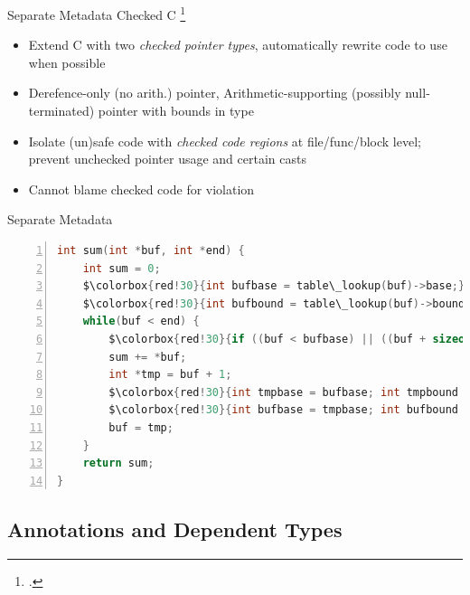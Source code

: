 \documentclass[aspectratio=169]{beamer}
\begin{document}
\begin{frame}{Separate Metadata}
Checked C \footcite{ruef_checked_2017}
    \begin{itemize}
        \item Extend C with two \emph{checked pointer types}, automatically rewrite code to use when possible
        \item Derefence-only (no arith.) pointer, Arithmetic-supporting (possibly null-terminated) pointer with bounds in type
        \item Isolate (un)safe code with \emph{checked code regions} at file/func/block level; prevent unchecked pointer usage and certain casts
        \item Cannot blame checked code for violation
    \end{itemize}
\end{frame}


\begin{frame}[fragile]{Separate Metadata}
  \footnotesize
  \begin{lstlisting}[language=C,numbers=left,mathescape,basicstyle={\footnotesize\ttfamily}]
int sum(int *buf, int *end) {
    int sum = 0;
    $\colorbox{red!30}{int bufbase = table\_lookup(buf)->base;}$
    $\colorbox{red!30}{int bufbound = table\_lookup(buf)->bound;}$
    while(buf < end) {
        $\colorbox{red!30}{if ((buf < bufbase) || ((buf + sizeof(buf)) > bufbound)) abort;}$
        sum += *buf;
        int *tmp = buf + 1;
        $\colorbox{red!30}{int tmpbase = bufbase; int tmpbound = bufbound;}$ // inherit base and bound
        $\colorbox{red!30}{int bufbase = tmpbase; int bufbound = tmpbound;}$ // would be optimized out
        buf = tmp;
    }
    return sum;
}
  \end{lstlisting}
\end{frame}

\subsection{Annotations and Dependent Types}
\end{document}
